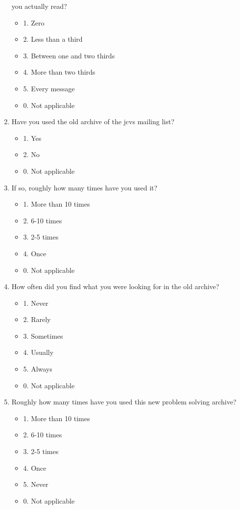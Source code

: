 \begin{enumerate}
  you actually read?
  \begin{itemize}
  \item 1. Zero
  \item 2. Less than a third
  \item 3. Between one and two thirds
  \item 4. More than two thirds
  \item 5. Every message
  \item 0. Not applicable
  \end{itemize}
\item Have you used the old archive of the jcvs mailing list?
  \begin{itemize}
  \item 1. Yes
  \item 2. No
  \item 0. Not applicable
  \end{itemize}  
\item If so, roughly how many times have you used it?
  \begin{itemize}
  \item 1. More than 10 times
  \item 2. 6-10 times
  \item 3. 2-5 times
  \item 4. Once
  \item 0. Not applicable
  \end{itemize}
\item How often did you find what you were looking for in the old archive?
  \begin{itemize}
  \item 1. Never
  \item 2. Rarely
  \item 3. Sometimes
  \item 4. Usually
  \item 5. Always
  \item 0. Not applicable
  \end{itemize}
\item Roughly how many times have you used this new problem solving archive?
  \begin{itemize}
  \item 1. More than 10 times
  \item 2. 6-10 times
  \item 3. 2-5 times
  \item 4. Once
  \item 5. Never
  \item 0. Not applicable
  \end{itemize}

\end{enumerate}
